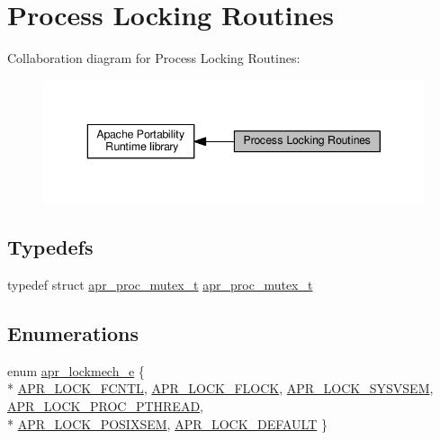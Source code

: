 \hypertarget{group__apr__proc__mutex}{}\section{Process Locking Routines}
\label{group__apr__proc__mutex}
Collaboration diagram for Process Locking Routines\+:
\nopagebreak
\begin{figure}[H]
\begin{center}
\leavevmode
\includegraphics[width=343pt]{group__apr__proc__mutex}
\end{center}
\end{figure}
\subsection*{Typedefs}
\begin{DoxyCompactItemize}
\item 
typedef struct \hyperlink{structapr__proc__mutex__t}{apr\+\_\+proc\+\_\+mutex\+\_\+t} \hyperlink{group__apr__proc__mutex_ga0fae3a1ab686cd1f252c6062e4c97bd2}{apr\+\_\+proc\+\_\+mutex\+\_\+t}
\end{DoxyCompactItemize}
\subsection*{Enumerations}
\begin{DoxyCompactItemize}
\item 
enum \hyperlink{group__apr__proc__mutex_ga75dd95a48a1e855a87b509b522746ed4}{apr\+\_\+lockmech\+\_\+e} \{ \\*
\hyperlink{group__apr__proc__mutex_gga75dd95a48a1e855a87b509b522746ed4ad9dad69d83d1e112054ad21a7e4e16b3}{A\+P\+R\+\_\+\+L\+O\+C\+K\+\_\+\+F\+C\+N\+TL}, 
\hyperlink{group__apr__proc__mutex_gga75dd95a48a1e855a87b509b522746ed4a1d06f73a37dae31233299401c9594b41}{A\+P\+R\+\_\+\+L\+O\+C\+K\+\_\+\+F\+L\+O\+CK}, 
\hyperlink{group__apr__proc__mutex_gga75dd95a48a1e855a87b509b522746ed4a642536695bd4c233761a15d48b1d6487}{A\+P\+R\+\_\+\+L\+O\+C\+K\+\_\+\+S\+Y\+S\+V\+S\+EM}, 
\hyperlink{group__apr__proc__mutex_gga75dd95a48a1e855a87b509b522746ed4abd5e7cca2c9f6023b541131f3841057a}{A\+P\+R\+\_\+\+L\+O\+C\+K\+\_\+\+P\+R\+O\+C\+\_\+\+P\+T\+H\+R\+E\+AD}, 
\\*
\hyperlink{group__apr__proc__mutex_gga75dd95a48a1e855a87b509b522746ed4a6d65d9d745e13d8759bd8f1057f27041}{A\+P\+R\+\_\+\+L\+O\+C\+K\+\_\+\+P\+O\+S\+I\+X\+S\+EM}, 
\hyperlink{group__apr__proc__mutex_gga75dd95a48a1e855a87b509b522746ed4ae91fb435c45216bcf84f506db99d0f19}{A\+P\+R\+\_\+\+L\+O\+C\+K\+\_\+\+D\+E\+F\+A\+U\+LT}
 \}
\end{DoxyCompactItemize}
